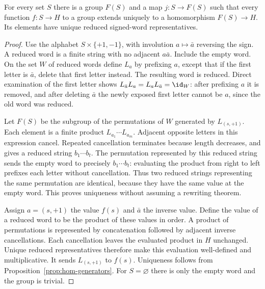 \begin{theorem}\label{thm:free-group}
For every set $S$ there is a group $F(S)$ and a map $j:S\to F(S)$ such that every function $f:S\to H$ to a group extends uniquely to a homomorphism $F(S)\to H$. Its elements have unique reduced signed-word representatives.
\end{theorem}
\begin{proof}
Use the alphabet $S\times\{+1,-1\}$, with involution $a\mapsto\bar a$ reversing the sign. A reduced word is a finite string with no adjacent $a\bar a$. Include the empty word. On the set $W$ of reduced words define $L_a$ by prefixing $a$, except that if the first letter is $\bar a$, delete that first letter instead. The resulting word is reduced. Direct examination of the first letter shows $L_{\bar a}L_a=L_aL_{\bar a}=\id_W$: after prefixing $a$ it is removed, and after deleting $\bar a$ the newly exposed first letter cannot be $a$, since the old word was reduced.

Let $F(S)$ be the subgroup of the permutations of $W$ generated by $L_{(s,+1)}$. Each element is a finite product $L_{a_1}\cdots L_{a_m}$. Adjacent opposite letters in this expression cancel. Repeated cancellation terminates because length decreases, and gives a reduced string $b_1\cdots b_t$. The permutation represented by this reduced string sends the empty word to precisely $b_1\cdots b_t$: evaluating the product from right to left prefixes each letter without cancellation. Thus two reduced strings representing the same permutation are identical, because they have the same value at the empty word. This proves uniqueness without assuming a rewriting theorem.

Assign $a=(s,+1)$ the value $f(s)$ and $\bar a$ the inverse value. Define the value of a reduced word to be the product of these values in order. A product of permutations is represented by concatenation followed by adjacent inverse cancellations. Each cancellation leaves the evaluated product in $H$ unchanged. Unique reduced representatives therefore make this evaluation well-defined and multiplicative. It sends $L_{(s,+1)}$ to $f(s)$. Uniqueness follows from Proposition~\ref{prop:hom-generators}. For $S=\varnothing$ there is only the empty word and the group is trivial.
\end{proof}

